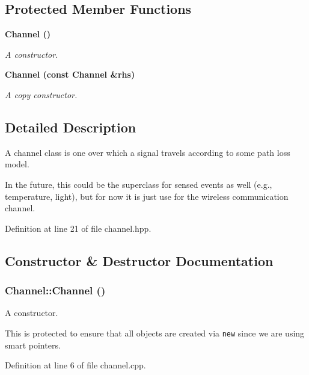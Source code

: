 \subsection*{Protected Member Functions}
\begin{CompactItemize}
\item 
\bf{Channel} ()
\begin{CompactList}\small\item\em A constructor. \item\end{CompactList}\item 
\bf{Channel} (const \bf{Channel} \&rhs)
\begin{CompactList}\small\item\em A copy constructor. \item\end{CompactList}\end{CompactItemize}


\subsection{Detailed Description}
A channel class is one over which a signal travels according to some path loss model. 

In the future, this could be the superclass for sensed events as well (e.g., temperature, light), but for now it is just use for the wireless communication channel. 



Definition at line 21 of file channel.hpp.

\subsection{Constructor \& Destructor Documentation}
\subsubsection{\setlength{\rightskip}{0pt plus 5cm}Channel::Channel ()\hspace{0.3cm}{\tt  [protected]}}\label{classChannel_f2b4b16288cbb2c592b1e0f6486c2430}


A constructor. 

This is protected to ensure that all objects are created via {\tt new} since we are using smart pointers. 

Definition at line 6 of file channel.cpp.
